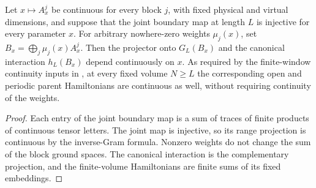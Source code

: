 \begin{lemma}
    \label{thm:continuous_block_finite_window_parent_hamiltonian}
    \leanok
    Let $x\mapsto A_x^j$ be continuous for every block $j$, with fixed
    physical and virtual dimensions, and suppose that the joint boundary
    map at length $L$ is injective for every parameter $x$. For arbitrary nowhere-zero weights $\mu_j(x)$, set
    $B_x=\bigoplus_j\mu_j(x)A_x^j$. Then the projector onto $G_L(B_x)$
    and the canonical interaction $h_L(B_x)$ depend continuously on $x$.
    As required by the finite-window continuity inputs in
    \cite[Appendix~A, lines~2575--2578]{Schuch2011Phases}, at every fixed
    volume $N\geq L$ the corresponding open and periodic parent Hamiltonians
    are continuous as well, without requiring continuity of the weights.
\end{lemma}
\begin{proof}
    \leanok
    Each entry of the joint boundary map is a sum of traces of finite
    products of continuous tensor letters. The joint map is injective,
    so its range projection is continuous by the inverse-Gram formula.
    Nonzero weights do not change the sum of the block ground spaces.
    The canonical interaction is the complementary projection, and the
    finite-volume Hamiltonians are finite sums of its fixed embeddings.
\end{proof}


